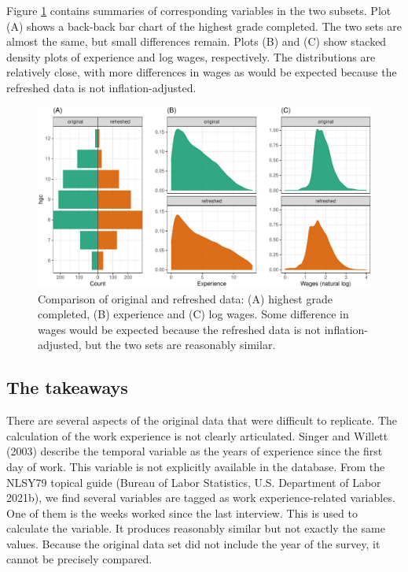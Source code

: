 \documentclass[12pt]{article}
\begin{document}
Figure \ref{fig:compare-subsets} contains summaries of corresponding variables in the two subsets. Plot (A) shows a back-back bar chart of the highest grade completed. The two sets are almost the same, but small differences remain. Plots (B) and (C) show stacked density plots of experience and log wages, respectively. The distributions are relatively close, with more differences in wages as would be expected because the refreshed data is not inflation-adjusted.

\begin{figure}

{\centering \includegraphics[width=1\linewidth]{figures/compare-subsets-1} 

}

\caption{Comparison of original and refreshed data: (A) highest grade completed, (B) experience and (C) log wages. Some difference in wages would be expected because the refreshed data is not inflation-adjusted, but the two sets are reasonably similar.}\label{fig:compare-subsets}
\end{figure}

\hypertarget{takeaways}{%
\subsection{The takeaways}\label{takeaways}}

There are several aspects of the original data that were difficult to replicate. The calculation of the work experience is not clearly articulated. Singer and Willett (2003) describe the temporal variable as the years of experience since the first day of work. This variable is not explicitly available in the database. From the NLSY79 topical guide (Bureau of Labor Statistics, U.S. Department of Labor 2021b), we find several variables are tagged as work experience-related variables. One of them is the weeks worked since the last interview. This is used to calculate the variable. It produces reasonably similar but not exactly the same values. Because the original data set did not include the year of the survey, it cannot be precisely compared.
\end{document}
